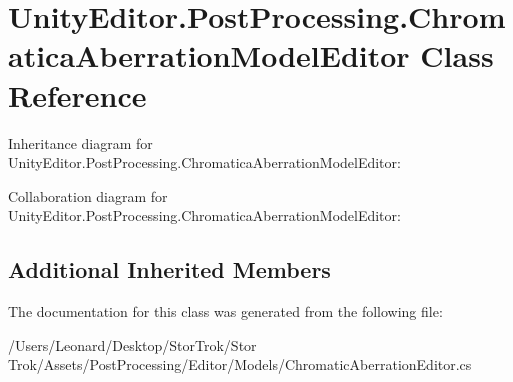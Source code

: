 \hypertarget{class_unity_editor_1_1_post_processing_1_1_chromatica_aberration_model_editor}{}\section{Unity\+Editor.\+Post\+Processing.\+Chromatica\+Aberration\+Model\+Editor Class Reference}
\label{class_unity_editor_1_1_post_processing_1_1_chromatica_aberration_model_editor}


Inheritance diagram for Unity\+Editor.\+Post\+Processing.\+Chromatica\+Aberration\+Model\+Editor\+:


Collaboration diagram for Unity\+Editor.\+Post\+Processing.\+Chromatica\+Aberration\+Model\+Editor\+:
\subsection*{Additional Inherited Members}


The documentation for this class was generated from the following file\+:\begin{DoxyCompactItemize}
\item 
/\+Users/\+Leonard/\+Desktop/\+Stor\+Trok/\+Stor Trok/\+Assets/\+Post\+Processing/\+Editor/\+Models/Chromatic\+Aberration\+Editor.\+cs\end{DoxyCompactItemize}
